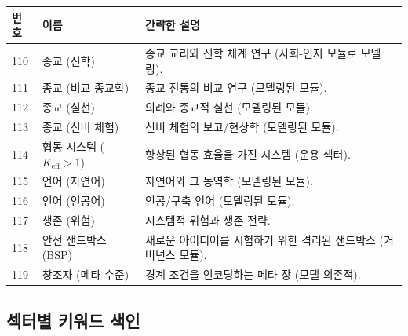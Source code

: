 \documentclass[13pt,a4paper]{article}
\newcommand{\Keff}{K_{\mathrm{eff}}}
\begin{document}
	\begin{longtable}{|p{0.9cm}|p{6.0cm}|p{8.6cm}|}
		\hline
		\textbf{번호} & \textbf{이름} & \textbf{간략한 설명} \\
		\hline
		\endhead
		110 & 종교 (신학) & 종교 교리와 신학 체계 연구 (사회-인지 모듈로 모델링). \\
		\hline
		111 & 종교 (비교 종교학) & 종교 전통의 비교 연구 (모델링된 모듈). \\
		\hline
		112 & 종교 (실천) & 의례와 종교적 실천 (모델링된 모듈). \\
		\hline
		113 & 종교 (신비 체험) & 신비 체험의 보고/현상학 (모델링된 모듈). \\
		\hline
		114 & 협동 시스템 ($\Keff>1$) & 향상된 협동 효율을 가진 시스템 (운용 섹터). \\
		\hline
		115 & 언어 (자연어) & 자연어와 그 동역학 (모델링된 모듈). \\
		\hline
		116 & 언어 (인공어) & 인공/구축 언어 (모델링된 모듈). \\
		\hline
		117 & 생존 (위험) & 시스템적 위험과 생존 전략. \\
		\hline
		118 & 안전 샌드박스 (BSP) & 새로운 아이디어를 시험하기 위한 격리된 샌드박스 (거버넌스 모듈). \\
		\hline
		119 & 창조자 (메타 수준) & 경계 조건을 인코딩하는 메타 장 (모델 의존적). \\
		\hline
	\end{longtable}
	
	\subsection*{섹터별 키워드 색인}
	
\end{document}
